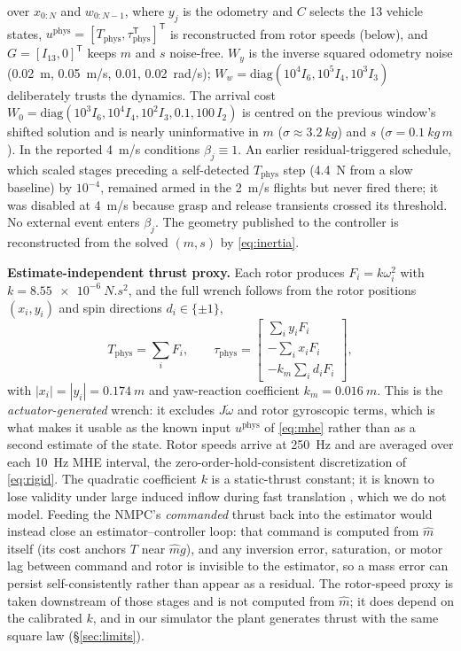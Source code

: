 \documentclass[conference]{IEEEtran}
\begin{document}
over $x_{0:N}$ and $w_{0:N-1}$, where $y_j$ is the odometry and $C$ selects the 13 vehicle
states,
$u^{\mathrm{phys}}=[T_{\text{phys}},\tau_{\text{phys}}^{\mathsf T}]^{\mathsf T}$ is reconstructed
from rotor speeds (below), and $G=[I_{13},0]^{\mathsf T}$ keeps $m$ and $s$ noise-free.
$W_y$ is the inverse squared odometry noise (\SI{0.02}{m}, \SI{0.05}{m/s}, 0.01,
\SI{0.02}{rad/s}); $W_w=\mathrm{diag}(10^4 I_6,10^5 I_4,10^3 I_3)$ deliberately trusts the
dynamics. The arrival cost $W_0=\mathrm{diag}(10^3 I_6,10^4 I_4,10^2 I_3,0.1,100\,I_2)$ is
centred on the previous window's shifted solution and is nearly uninformative in $m$
($\sigma\approx\SI{3.2}{kg}$) and $s$ ($\sigma=\SI{0.1}{kg\,m}$). In the reported \SI{4}{m/s} conditions $\beta_j\equiv1$. An earlier residual-triggered
schedule, which scaled stages preceding a self-detected $T_{\text{phys}}$ step (\SI{4.4}{N} from
a slow baseline) by $10^{-4}$, remained armed in the \SI{2}{m/s} flights but never fired there; it was
disabled at \SI{4}{m/s} because grasp and release transients crossed its threshold. No external
event enters $\beta_j$. The geometry published to the controller is reconstructed from the
solved $(m,s)$ by \eqref{eq:inertia}.

\textbf{Estimate-independent thrust proxy.} Each rotor produces $F_i=k\omega_i^2$ with
$k=\SI{8.55e-6}{N.s^2}$, and the full wrench follows from the rotor positions $(x_i,y_i)$ and
spin directions $d_i\in\{\pm1\}$,
\begin{equation}
T_{\text{phys}}=\sum_i F_i,\qquad
\tau_{\text{phys}}=\begin{bmatrix}
 \sum_i y_i F_i\\[-1pt] -\sum_i x_i F_i\\[-1pt] -k_m\sum_i d_i F_i
\end{bmatrix},
\label{eq:wrench}
\end{equation}
with $|x_i|=|y_i|=\SI{0.174}{m}$ and yaw-reaction coefficient $k_m=\SI{0.016}{m}$. This is the
\emph{actuator-generated} wrench: it excludes $J\dot\omega$ and rotor gyroscopic terms, which is
what makes it usable as the known input $u^{\mathrm{phys}}$ of \eqref{eq:mhe} rather than as a
second estimate of the state. Rotor speeds arrive at \SI{250}{Hz} and are averaged over each
\SI{10}{Hz} MHE interval, the zero-order-hold-consistent discretization of
\eqref{eq:rigid}. The quadratic coefficient $k$ is a static-thrust constant; it is known to lose
validity under large induced inflow during fast translation \cite{bangura2012}, which we do
not model. Feeding the NMPC's \emph{commanded} thrust back into the estimator would instead
close an estimator--controller loop: that command is computed from $\hat m$ itself (its cost
anchors $T$ near $\hat m g$), and any inversion error, saturation, or motor lag between command
and rotor is invisible to the estimator, so a mass error can persist self-consistently rather
than appear as a residual. The rotor-speed proxy is taken downstream of those stages and is not
computed from $\hat m$; it does depend on the calibrated $k$, and in our simulator the plant
generates thrust with the same square law (\S\ref{sec:limits}).
\end{document}
